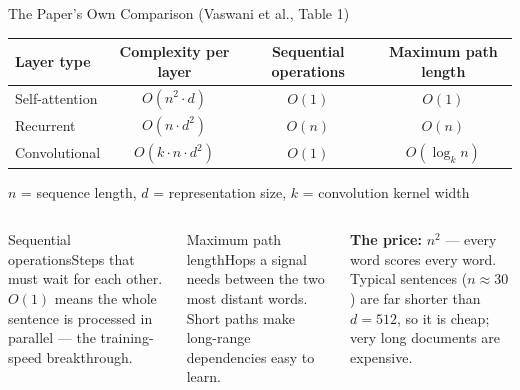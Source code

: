 \documentclass[aspectratio=169,10pt]{beamer}
\begin{document}
\begin{frame}{The Paper's Own Comparison (Vaswani et al., Table 1)}
\centering\small\renewcommand{\arraystretch}{1.35}
\begin{tabular}{lccc}
\toprule
\textbf{Layer type}&\textbf{Complexity per layer}&\textbf{Sequential operations}&\textbf{Maximum path length}\\\midrule
\rowcolor{AccentCol!10}Self-attention&$O(n^2\cdot d)$&$O(1)$&$O(1)$\\
Recurrent&$O(n\cdot d^2)$&$O(n)$&$O(n)$\\
Convolutional&$O(k\cdot n\cdot d^2)$&$O(1)$&$O(\log_k n)$\\\bottomrule
\end{tabular}

\scriptsize $n$ = sequence length, $d$ = representation size, $k$ = convolution kernel width
\vspace{4pt}
\raggedright
\begin{columns}[T]
\begin{cbox}{Sequential operations}\scriptsize Steps that must wait for each other. $O(1)$ means the whole sentence is processed in parallel --- the training-speed breakthrough.\end{cbox}
\begin{cbox}{Maximum path length}\scriptsize Hops a signal needs between the two most distant words. Short paths make long-range dependencies easy to learn.\end{cbox}
\begin{wbox}\scriptsize\textbf{The price:} $n^2$ --- every word scores every word. Typical sentences ($n\approx30$) are far shorter than $d=512$, so it is cheap; very long documents are expensive.\end{wbox}
\end{columns}
\end{frame}
\end{document}
